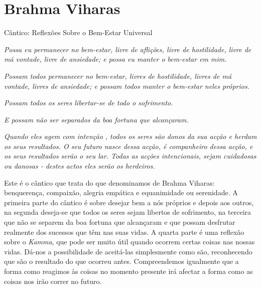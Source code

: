 \chapter{Brahma Viharas}

Cântico: Reflexões Sobre o Bem-Estar Universal

\emph{Possa eu permanecer no bem-estar, livre de aflições, livre de
hostilidade, livre de má vontade, livre de ansiedade; e possa eu manter
o bem-estar em mim.}

\emph{Possam todos permanecer no bem-estar, livres de hostilidade,
livres de má vontade, livres de ansiedade; e possam todos manter o
bem-estar neles próprios.}

\emph{Possam todos os seres libertar-se de todo o sofrimento.}

\emph{E possam não ser separados da boa fortuna que alcançaram. }

\emph{Quando eles agem com intenção , todos os seres são donos da sua
acção e herdam os seus resultados. O seu futuro nasce dessa acção, é
companheiro dessa acção, e os seus resultados serão o seu lar. Todas as
acções intencionais, sejam cuidadosas ou danosas - destes actos eles
serão os herdeiros.}

Este é o cântico que trata do que denominamos de Brahma Viharas:
benquerença, compaixão, alegria empática e equanimidade ou serenidade. A
primeira parte do cântico é sobre desejar bem a nós próprios e depois
aos outros, na segunda deseja-se que todos os seres sejam libertos de
sofrimento, na terceira que não se separem da boa fortuna que alcançaram
e que possam desfrutar realmente dos sucessos que têm nas suas vidas. A
quarta parte é uma reflexão sobre o \emph{Kamma}, que pode ser muito
útil quando ocorrem certas coisas nas nossas vidas. Dá-nos a
possibilidade de aceitá-las simplesmente como são, reconhecendo que são
o resultado do que ocorreu antes. Compreendemos igualmente que a forma
como reagimos às coisas no momento presente irá afectar a forma como as
coisas nos irão correr no futuro.

